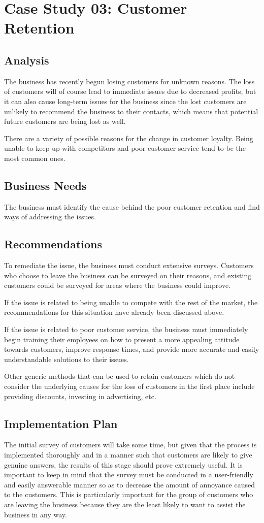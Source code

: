 \documentclass{article}
\begin{document}
\section{Case Study 03: Customer Retention}
\subsection{Analysis}
The business has recently begun losing customers for unknown reasons. The loss of customers will of course lead to immediate issues due to decreased profits, but it can also cause long-term issues for the business since the lost customers are unlikely to recommend the business to their contacts, which means that potential future customers are being lost as well.

There are a variety of possible reasons for the change in customer loyalty. Being unable to keep up with competitors and poor customer service tend to be the most common ones.

\subsection{Business Needs}
The business must identify the cause behind the poor customer retention and find ways of addressing the issues.

\subsection{Recommendations}
To remediate the issue, the business must conduct extensive surveys. Customers who choose to leave the business can be surveyed on their reasons, and existing customers could be surveyed for areas where the business could improve.

If the issue is related to being unable to compete with the rest of the market, the recommendations for this situation have already been discussed above.

If the issue is related to poor customer service, the business must immediately begin training their employees on how to present a more appealing attitude towards customers, improve response times, and provide more accurate and easily understandable solutions to their issues.

Other generic methods that can be used to retain customers which do not consider the underlying causes for the loss of customers in the first place include providing discounts, investing in advertising, etc.

\subsection{Implementation Plan}
The initial survey of customers will take some time, but given that the process is implemented thoroughly and in a manner such that customers are likely to give genuine answers, the results of this stage should prove extremely useful. It is important to keep in mind that the survey must be conducted in a user-friendly and easily answerable manner so as to decrease the amount of annoyance caused to the customers. This is particularly important for the group of customers who are leaving the business because they are the least likely to want to assist the business in any way.
\end{document}
